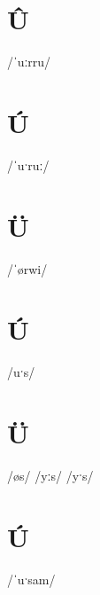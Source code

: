 \documentclass[10pt,a4paper,twoside]{book}
\begin{document}
\section*{Û}

\begin{multicols}{3}
 {/ˈuːrru/} {}
\end{multicols}

\section*{Ú}

\begin{multicols}{3}
 {/ˈuˑruː/} {}
\end{multicols}

\section*{Ü}

\begin{multicols}{3}
 {/ˈørwi/} {}
\end{multicols}

\section*{Ú}

\begin{multicols}{3}
 {/uˑs/} {}
\end{multicols}

\section*{Ü}

\begin{multicols}{3}
 {/øs/} {}
 {/yːs/} {}
 {/yˑs/} {}
\end{multicols}

\section*{Ú}

\begin{multicols}{3}
 {/ˈuˑsam/} {}
\end{multicols}
\end{document}
